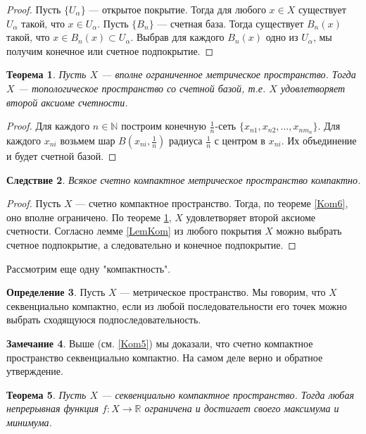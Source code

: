 \documentclass[12pt, titlepage, oneside]{amsbook}
\newcommand{\NN}{\mathbb{N}}
\newcommand{\RR}{\mathbb{R}}
\newtheorem{theorem}{Теорема}[chapter]
\newtheorem{corollary}[theorem]{Следствие}
\theoremstyle{definition}
\newtheorem{definition}[theorem]{Определение}
\newtheorem{remark}[theorem]{Замечание}
\theoremstyle{remark}
\begin{document}
\begin{proof}
	Пусть $\{U_{\alpha}\}$ --- открытое покрытие. Тогда для любого $x\in X$ существует $U_{\alpha}$ такой, что $x\in U_{\alpha}$. Пусть $\{B_n\}$ --- счетная база. Тогда существует $B_n(x)$ такой, что $x\in B_n(x)\subset U_{\alpha}$. Выбрав для каждого $B_n(x)$ одно из $U_{\alpha}$, мы получим конечное или счетное подпокрытие.
\end{proof}

\begin{theorem}
	\label{MetS}
	Пусть $X$ --- вполне ограниченное метрическое пространство. Тогда $X$ --- топологическое пространство со счетной базой, т.е. $X$ удовлетворяет второй аксиоме счетности.
\end{theorem}

\begin{proof}
	Для каждого $n\in\NN$ построим конечную $\frac{1}{n}$-сеть $\{x_{n1},x_{n2},\ldots,x_{nm_n}\}$. Для каждого $x_{ni}$ возьмем шар $B(x_{ni},\frac{1}{n})$ радиуса $\frac{1}{n}$ с центром в $x_{ni}$. Их объединение и будет счетной базой.
\end{proof}

\begin{corollary}
	\label{Kom7}
	Всякое счетно компактное метрическое пространство компактно.
\end{corollary}

\begin{proof}
	Пусть $X$ --- счетно компактное пространство. Тогда, по теореме \ref{Kom6}, оно вполне ограничено. По теореме \ref{MetS}, $X$ удовлетворяет второй аксиоме счетности. Согласно лемме \ref{LemKom} из любого покрытия $X$ можно выбрать счетное подпокрытие, а следовательно и конечное подпокрытие.
\end{proof}

Рассмотрим еще одну "компактность".

\begin{definition}
	Пусть $X$ --- метрическое пространство. Мы говорим, что $X$ секвенциально компактно, если из любой последовательности его точек можно выбрать сходящуюся подпоследовательность.
\end{definition}

\begin{remark}
	Выше (см. \ref{Kom5}) мы доказали, что счетно компактное пространство секвенциально компактно. На самом деле верно и обратное утверждение.
\end{remark}

\begin{theorem}
	\label{Kom8}
	Пусть $X$ --- секвенциально компактное пространство. Тогда любая непрерывная функция $f\colon X\rightarrow\RR$ ограничена и достигает своего максимума и минимума.
\end{theorem}
\end{document}
